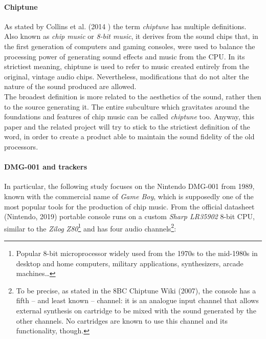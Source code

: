 \documentclass[]{article}
\begin{document}
        \paragraph{Chiptune} %
        As stated by Collins et al. (2014 )\nocite{COLLINS2014} the term \emph{chiptune} has multiple 
        definitions. Also known as \emph{chip music} or \emph{8-bit music}, it derives from the sound chips that,
         in the first generation of computers and gaming consoles,
         were used to balance the processing power of generating sound effects and music from the
        CPU. In its strictiest meaning, chiptune is used to refer to music created entirely from the original, vintage audio 
        chips. Nevertheless, modifications that do not alter the nature of the sound produced are allowed.\\
        The broadest definition is more related to the aesthetics of the sound, rather then to the source
        generating it. The entire subculture which gravitates around the foundations and features of chip
        music can be called \emph{chiptune} too. Anyway, this paper and the related project will try to stick
        to the strictiest definition of the word, in order to create a product able to maintain the sound fidelity
        of the old processors.

        \paragraph{DMG-001 and trackers} %
        In particular, the following study focuses on the Nintendo DMG-001 from 1989, known with the commercial 
        name of \emph{Game Boy}, which is supposedly one of the most popular tools for the production of chip music.
        From the official datasheet (Nintendo, 2019)\nocite{NINTENDO2019} portable console runs on a custom 
        \emph{Sharp LR35902} 8-bit CPU, similar to the \emph{Zilog Z80}\footnote{Popular 8-bit microprocessor widely used 
        from the 1970s to the mid-1980s in desktop and home computers, military applications, synthesizers, arcade machines\ldots} 
        and has four audio channels\footnote{To be precise, as stated in the 8BC Chiptune Wiki (2007)\nocite{8BCCHIPTUNE2007}, 
        the console has a fifth -- and least known -- channel: it is an analogue input channel that allows 
        external synthesis on cartridge to be mixed with the sound generated by the other channels. No cartridges 
        are known to use this channel and its functionality, though.}:\\[10pt]
        
\end{document}
